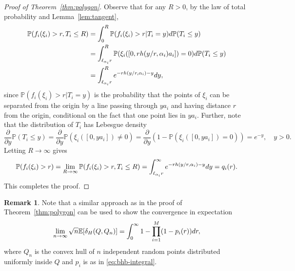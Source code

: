 \documentclass[a4paper,12pt]{article}
\theoremstyle{definition}
\newtheorem{remark}{Remark}
\newcommand{\IE}{\mathbb{E}}
\newcommand{\IP}{\mathbb{P}}
\newcommand{\dd}{{\rm d}}
\begin{document}
\begin{proof}[Proof of Theorem~\ref{thm:polygon}]
Observe that for any $R>0$, by the law of total probability and Lemma~\ref{lem:tangent},
\begin{align*}
\IP(f_i(\xi_i)>r,T_i\le R)
&=\int_0^R \IP(f_i(\xi_i)>r \vert T_i=y) \dd \IP(T_i\le y)\\
&=\int_{\ell_{\alpha_i}r}^R \IP(\xi_i([0,r h(y/r,\alpha_i)a_i])=0) \dd \IP(T_i\le y)\\
&=\int_{\ell_{\alpha_i}r}^R e^{-r h(y/r,\alpha_i)-y} \dd y,
\end{align*}
since $\IP(f_i(\xi_i)>r \vert T_i=y)$ is the probability that the points of $\xi_i$ can be separated from the origin by a line passing through $ya_i$ and having distance $r$ from the origin, conditional on the fact that one point lies in $ya_i$. Further, note that the distribution of $T_i$ has Lebesgue density 
\[
\frac{\partial}{\partial y}\IP(T_i\le y)
=\frac{\partial}{\partial y}\IP(\xi_i([0,ya_i])\neq 0)
=\frac{\partial}{\partial y}(1-\IP(\xi_i([0,ya_i])= 0))
=e^{-y}, \quad y>0.
\]
Letting $R\to\infty$ gives
\[
\IP(f_i(\xi_i)>r)
=\lim_{R\to\infty} \IP(f_i(\xi_i)>r,T_i\le R)
=\int_{\ell_{\alpha_i}r}^{\infty} e^{-r h(y/r,\alpha_i)-y} \dd y
=q_i(r).
\]
This completes the proof.
	
\end{proof}

\begin{remark}
	Note that a similar approach as in the proof of Theorem~\ref{thm:polygon} can be used to show the convergence in expectation
\[
\lim_{n\to\infty} \sqrt{n}\IE[\delta_{H}(Q,Q_{n})]
=\int_0^{\infty}1-\prod_{i=1}^{M}(1-p_{i}(r))\dd r,
\]
where $Q_n$ is the convex hull of $n$ independent random points distributed uniformly inside $Q$ and $p_i$ is as in \eqref{eq:bhb-integral}. 
\end{remark}
\end{document}
